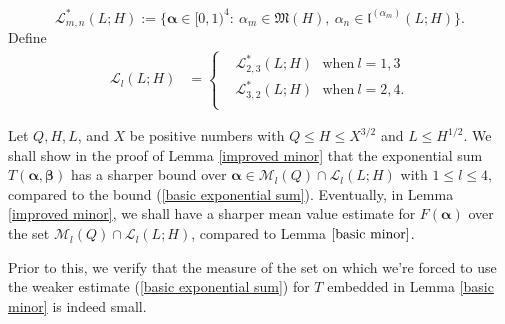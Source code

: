 \documentclass{amsart}%
\numberwithin{equation}{section}
\theoremstyle{remark}
\newcommand{\1}{\mathbbm{1}}
\newcommand{\balp}{\boldsymbol{\alpha}}
\begin{document}
\begin{equation}\label{def of Lmn(L)}
    \mathcal{L}^*_{m,n}(L; H):=\{\balp \in [0,1)^{4}:\ \alpha_m \in {\mathfrak M}(H), \ \alpha_n\in \mathfrak{l}^{(\alpha_m)}(L; H) \}.
\end{equation}
Define 
\begin{equation}\label{def of Ll(L;H)}
    \begin{aligned}
        \mathcal{L}_l(L;H) &=\left\{\begin{aligned}
            &\mathcal{L}_{2,3}^*(L; H)  \ \ \ \text{when}\ l=1, 3\\
            &\mathcal{L}_{3,2}^*(L; H)\ \ \ \text{when}\ l=2, 4.\\
        \end{aligned}\right.
    \end{aligned}
\end{equation}

Let $Q, H, L$, and $X$ be positive numbers with $Q \leq H\leq X^{3/2}$ and $L\leq H^{1/2}$. We shall show in the proof of Lemma \ref{improved minor} that the exponential sum $T(\boldsymbol{\alpha},\boldsymbol{\beta})$ has a sharper bound over $\boldsymbol{\alpha}\in\mathcal{M}_l(Q)\cap \mathcal{L}_{l}(L;H)$ with $1\leq l\leq 4,$ compared to the bound (\ref{basic exponential sum}). Eventually, in Lemma \ref{improved minor}, we shall have a sharper mean value estimate for $F(\boldsymbol{\alpha})$ over the set $\mathcal{M}_l(Q)\cap \mathcal{L}_{l}(L;H)$, compared to 
Lemma $\ref{basic minor}$.

Prior to this, we verify that the measure of the set on which we're forced to use the weaker estimate (\ref{basic exponential sum}) for $T$ embedded in Lemma \ref{basic minor} is indeed small. 
\end{document}

